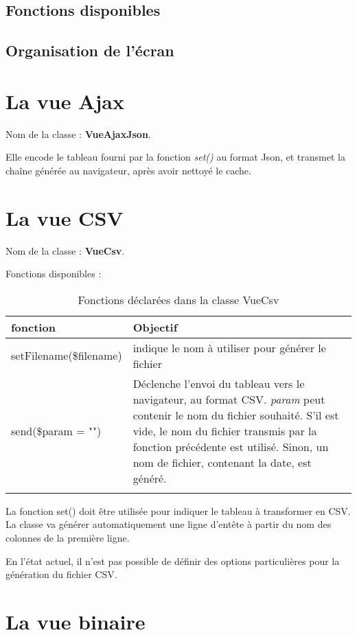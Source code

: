 \subsection{Fonctions disponibles}

\subsection{Organisation de l'écran}


\section{La vue Ajax}
Nom de la classe : \textbf{VueAjaxJson}.

Elle encode le tableau fourni par la fonction \textit{set()} au format Json, et transmet la chaîne générée au navigateur, après avoir nettoyé le cache.

\section{La vue CSV}

Nom de la classe : \textbf{VueCsv}.

Fonctions disponibles : 
\begin{longtable}{|p{5cm}|p{8cm}|}
\hline
\textbf{fonction} & \textbf{Objectif} \\
\hline
\endhead
setFilename(\$filename) & indique le nom à utiliser pour générer le fichier\\
\hline
send(\$param = "") & Déclenche l'envoi du tableau vers le navigateur, au format CSV. \textit{param} peut contenir le nom du fichier souhaité. S'il est vide, le nom du fichier transmis par la fonction précédente est utilisé. Sinon, un nom de fichier, contenant la date, est généré.\\
\hline
\caption{Fonctions déclarées dans la classe VueCsv}
\end{longtable}

La fonction set() doit être utilisée pour indiquer le tableau à transformer en CSV. La classe va générer automatiquement une ligne d'entête à partir du nom des colonnes de la première ligne.

En l'état actuel, il n'est pas possible de définir des options particulières pour la génération du fichier CSV.

\section{La vue binaire}

